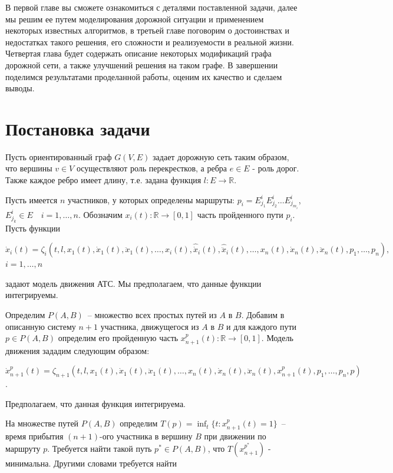 \documentclass[12pt, a4paper]{article}
\begin{document}
В первой главе вы сможете ознакомиться с деталями поставленной задачи, далее мы решим ее путем моделирования дорожной ситуации и применением некоторых известных алгоритмов, в третьей главе поговорим о достоинствах и недостатках такого решения, его сложности и реализуемости в реальной жизни. Четвертая глава будет содержать описание некоторых модификаций графа дорожной сети, а также улучшений решения на таком графе. В завершении поделимся результатами проделанной работы, оценим их качество и сделаем выводы.


\newpage
\section*{Постановка задачи}
Пусть ориентированный граф $ G (V, E)$ задает дорожную сеть таким образом, что вершины $ v \in V$ осуществляют роль перекрестков, а ребра $e \in E$ - роль дорог. Также каждое ребро имеет длину, т.е. задана функция $l : E \rightarrow \mathbb {R} $.

Пусть имеется $n$ участников, у которых определены маршруты: $p_i = E^i_{j_1} E^i_{j_2} \dots E^i_{j_{m_i}}$, \\ $ E^i_{j_k} \in E \quad i = 1, \dots, n$. Обозначим $x_i(t) : \mathbb {R} \rightarrow [0 , 1] $ часть пройденного пути $p_i$. Пусть функции 

\begin{center}
$ \dot{x}_i(t) = \zeta_i(t, l, x_1(t), \dot{x}_1(t), \ddot{x}_1(t), \dots, x_i(t), \hat{\dot{x}}_i(t), \hat{\ddot{x}}_i(t), \dots,  x_n(t), \dot{x}_n(t), \ddot{x}_n(t), p_1, \dots, p_n),$ $i = 1, \dots, n$
\end{center}
задают модель движения АТС. Мы предполагаем, что данные функции интегрируемы. 

Определим $P(A,B)$~-- множество всех простых путей из $A$ в $B$. Добавим в описанную систему $n+1$ участника, движущегося из $A$ в $B$ и для каждого пути $p \in P(A, B)$ определим его пройденную часть $x^p_{n+1}(t) : \mathbb {R} \rightarrow [0 , 1]$. Модель движения зададим следующим образом:
\begin{center}
	$ \dot{x}^p_{n+1}(t) = \zeta_{n+1}(t, l, x_1(t), \dot{x}_1(t), \ddot{x}_1(t), \dots, x_n(t), \dot{x}_n(t), \ddot{x}_n(t),  x^p_{n+1}(t), p_1, \dots, p_n, p)$. 
\end{center}
Предполагаем, что данная функция интегрируема.

На множестве путей $P(A,B)$ определим $T(p) = \displaystyle \inf_t \{t : x^p_{n+1}(t) = 1\}$~-- время прибытия $(n+1)$-ого участника в вершину $B$ при движении по маршруту $p$. Требуется найти такой путь $p^* \in P(A, B)$, что $T(x^{p^*}_{n+1})$ - минимальна. Другими словами требуется найти
\end{document}
